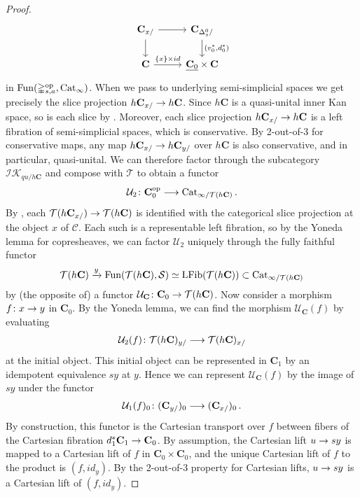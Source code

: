 \documentclass[10pt]{amsart}
\numberwithin{equation}{section}
\theoremstyle{definition}
\DeclareMathOperator{\Fun}{Fun}
\DeclareMathOperator{\op}{op}
\DeclareMathOperator{\LFib}{LFib}
\newcommand{\Cat}{\mathrm{Cat}\vphantom{t}}
\newcommand{\Simp}{\mathbb{\Delta}}
\newcommand{\cC}{\mathcal{C}}
\newcommand{\cS}{\mathcal{S}}
\newcommand{\cT}{\mathcal{T}}
\newcommand{\cU}{\mathcal{U}}
\newcommand{\bfC}{\mathbf{C}}
\newcommand{\IK}{\mathcal{IK}}
\renewcommand{\to}{\mathchoice{\longrightarrow}{\rightarrow}{}{}}
\begin{document}
\begin{proof}
\begin{equation*}
			\begin{tikzcd}
				\bfC_{x/} \arrow[r] \arrow[d]      &   \bfC_{\Delta^{0}_{s}/}  \arrow[d, "{(v_{0}^{*}, d_{0}^{*})}"] \\
				\bfC  \arrow[r, "\left\{ x\right\}\times id"]               &   \underline{\bfC_{0}} \times \bfC
			\end{tikzcd}
		\end{equation*}
		in $\Fun(\Simp^{\op}_{s,a},\Cat_{\infty})$.
    When we pass to underlying semi-simplicial spaces we get precisely the slice projection $h\bfC_{x/} \to h\bfC$.
    Since $h\bfC$ is a quasi-unital inner Kan space, so is each slice by .
    Moreover, each slice projection $h\bfC_{x/} \to h\bfC$ is a left fibration of semi-simplicial spaces, which is conservative.
     By 2-out-of-3 for conservative maps, any map $h\bfC_{x/} \to h\bfC_{y/}$ over $h\bfC$ is also conservative, and in particular, quasi-unital.
     We can therefore factor through the subcategory $\IK_{qu /h\bfC}$ and compose with $\cT$ to obtain a functor
		\begin{align*}
			\cU_{2}\colon \bfC_{0}^{\op} \to \Cat_{\infty / \cT(h\bfC) } \,.
		\end{align*}
		By , each $\cT(h\bfC_{x/}) \to \cT(h\bfC)$ is identified with the categorical slice projection at the object $x$ of $\cC$.
    Each such is a representable left fibration, so by the Yoneda lemma for copresheaves, we can factor $\cU_{2}$ uniquely through the fully faithful functor
		\begin{align*}
			\cT(h\bfC) \xrightarrow{y} \Fun(\cT(h\bfC), \cS) \simeq \LFib(\cT(h\bfC)) \subset \Cat_{\infty /\cT(h\bfC)}
		\end{align*}
		by (the opposite of) a functor $\cU_{\bfC} \colon \bfC_{0} \to \cT(h\bfC)$.
    Now consider a morphism $f\colon x\to y$ in $\bfC_{0}$.
    By the Yoneda lemma, we can find the morphism $\cU_{\bfC}(f)$ by evaluating
		\begin{align*}
			\cU_{2}(f)\colon \cT(h\bfC)_{y/} \to \cT(h\bfC)_{x/}
		\end{align*}
		at the initial object.
    This initial object can be represented in $\bfC_{1}$ by an idempotent equivalence $sy$ at $y$.
    Hence we can represent $\cU_{\bfC}(f)$ by the image of $sy$ under the functor
		\begin{align*}
			\cU_{1}(f)_{0} \colon (\bfC_{y/})_{0} \to (\bfC_{x/})_{0} \,.
		\end{align*}
		By construction, this functor is the Cartesian transport over $f$ between fibers of the Cartesian fibration $d_{1}^{*}\bfC_{1} \to \bfC_{0}$.
    By assumption, the Cartesian lift $u \to sy$ is mapped to a Cartesian lift of $f$ in $\bfC_{0}\times \bfC_{0}$, and the unique Cartesian lift of $f$ to the product is $(f,id_{y})$.
    By the 2-out-of-3 property for Cartesian lifts, $u\to sy$ is a Cartesian lift of $(f,id_{y})$.
	\end{proof}
\end{document}
